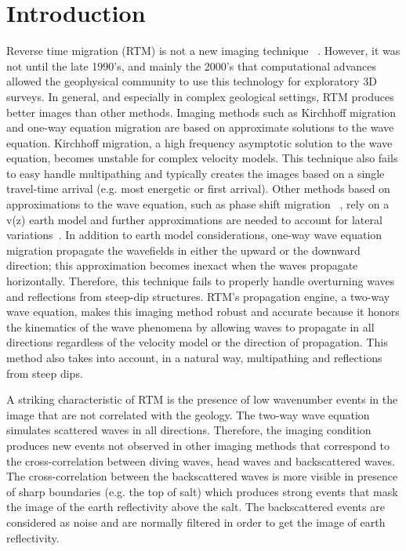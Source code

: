 \section{Introduction}

Reverse time migration (RTM) is not a new imaging technique ~\citep{baysal:1514, whitmore:382, GPR:GPR413}.
However, it was not until the late 1990’s, and mainly the 2000’s that computational
 advances allowed the geophysical community to use this technology for exploratory
3D surveys. In general, and especially in complex geological settings, RTM produces better 
images than other methods. Imaging methods such as Kirchhoff migration and one-way equation
 migration are based on approximate solutions to the wave equation. Kirchhoff migration,
 a high frequency asymptotic solution to the wave equation, becomes unstable for complex velocity models.
 This technique also fails to easy handle multipathing and typically creates the images based on a 
single travel-time arrival (e.g. most energetic or first arrival). Other methods based on approximations to the wave
 equation, such as phase shift migration ~\citep{gazdag:1342}, rely on a v(z) earth model and further
 approximations are needed to account for lateral variations~\citep{gazdag:124}.
 In addition to earth model considerations, one-way wave equation migration propagate the wavefields in 
either the upward or the downward direction; this approximation becomes inexact when the waves 
propagate horizontally. Therefore, this technique fails to properly handle overturning
waves and reflections from steep-dip structures. RTM's propagation engine, a two-way wave equation, 
makes this imaging method robust and accurate because it honors the kinematics of 
the wave phenomena by allowing waves to propagate in all directions regardless of
 the velocity model or the direction of propagation. This method also takes into account,
 in a natural way, multipathing and  reflections from steep dips.

A striking characteristic of RTM is the presence of low wavenumber events in the image that
 are not correlated with the geology. The two-way wave equation simulates scattered waves in all 
directions. Therefore, the imaging condition produces new events not observed in 
other imaging methods that correspond to the cross-correlation between diving waves, head waves 
and backscattered waves. The cross-correlation between the backscattered waves is more visible in
presence of sharp boundaries (e.g. the top of salt) which produces strong events that mask the image of the 
earth reflectivity above the salt. The backscattered events are considered as noise and are normally filtered in order
to get the image of earth reflectivity.

